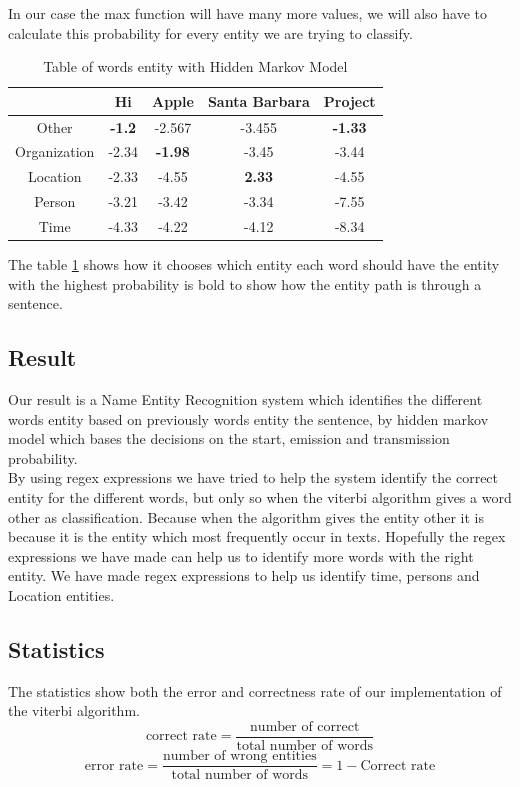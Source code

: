 \documentclass{article}
\begin{document}
In our case the max function will have many more values, we will also have to calculate this probability for every entity we are trying to classify.
\begin{table}[here]
\centering
\begin{tabular}{|c|c|c|c|c|}
\hline
 &  Hi & Apple & Santa Barbara & Project\\
\hline
Other & \textbf{-1.2} & -2.567 & -3.455 & \textbf{-1.33}\\
\hline
Organization & -2.34 & \textbf{-1.98} & -3.45 & -3.44\\
\hline
Location & -2.33 & -4.55 & \textbf{2.33} & -4.55\\
\hline
Person & -3.21 & -3.42 & -3.34 & -7.55\\
\hline
Time & -4.33 & -4.22 & -4.12 & -8.34\\
\hline
\end{tabular}
\caption{Table of words entity with Hidden Markov Model}
\label{tab:Table of words entity with hidden markov model}
\end{table}
The table \ref{tab:Table of words entity with hidden markov model} shows how it chooses which entity each word should have the entity with the highest probability is bold to show how the entity path is through a sentence.
\clearpage

\subsection{Result}
Our result is a Name Entity Recognition system which identifies the different words entity based on previously words entity the sentence, by hidden markov model which bases the decisions on the start, emission and transmission probability.\\
By using regex expressions we have tried to help the system identify the correct entity for the different words, but only so when the viterbi algorithm gives a word other as classification. Because when the algorithm gives the entity other it is because it is the entity which most frequently occur in texts. Hopefully the regex expressions we have made can help us to identify more words with the right entity. We have made regex expressions to help us identify time, persons and Location entities. 

\subsection{Statistics}
The statistics show both the error and correctness rate of our implementation of the viterbi algorithm.
\begin{equation}
\text{correct rate} = \frac{\text{number of correct}}{\text{total number of words}}
\end{equation}
\begin{equation}
\text{error rate} = \frac{\text{number of wrong entities}}{\text{total number of words}} = 1-\text{Correct rate}
\end{equation}
\end{document}
